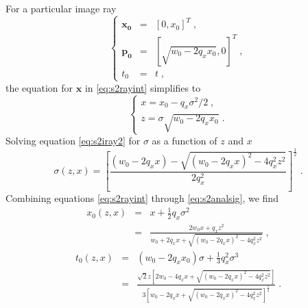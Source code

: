 For a particular image ray
\begin{equation}
\label{eq:s2iray}
\left\{ \begin{array}{lcl}
\mathbf{x_0} & = & [0, x_0]^T\;, \\
\mathbf{p_0} & = & [\sqrt{w_0 - 2 q_x x_0}, 0]^T\;, \\
t_0 & = & t\;,
\end{array} \right.
\end{equation}
the equation for $\mathbf{x}$ in \ref{eq:s2rayint} simplifies to
\begin{equation}
\label{eq:s2iray2}
\left\{ \begin{array}{lcl}
x = x_0 - q_x \sigma^2/2\;, \\
z = \sigma \sqrt{w_0 - 2 q_x x_0}\;.
\end{array} \right.
\end{equation}
Solving equation \ref{eq:s2iray2} for $\sigma$ as a function of $z$ and $x$
\begin{equation}
\label{eq:s2analsig}
\sigma (z,x) = \left[ \frac{(w_0 - 2 q_x x) 
- \sqrt{(w_0 - 2 q_x x)^2 - 4 q_x^2 z^2}}{2 q_x^2} 
\right]^{\frac{1}{2}}\;.
\end{equation}
Combining equations \ref{eq:s2rayint} through \ref{eq:s2analsig}, we find
\begin{eqnarray}
\label{eq:s2analx}
x_0 (z,x) & = & x + \frac{1}{2} q_x \sigma^2 \nonumber \\
& = & \frac{2 w_0 x + q_x z^2}{w_0 + 2 q_x x + \sqrt{(w_0 - 2 q_x x)^2 - 4 q_x^2 z^2}}\;,
\end{eqnarray}
\begin{eqnarray}
\label{eq:s2analt}
t_0 (z,x) & = & (w_0 - 2 q_x x_0) \sigma + \frac{1}{3} q_x^2 \sigma^3 \nonumber \\
& = & \frac{\sqrt{2} z \left[ 2 w_0 - 4 q_x x + \sqrt{(w_0 - 2 q_x x)^2 - 4 q_x^2 z^2} 
\right]}{3 \left[ w_0 - 2 q_x x + \sqrt{(w_0 - 2 q_x x)^2 - 4 q_x^2 z^2} \right]^{\frac{1}{2}}}\;.
\end{eqnarray}

